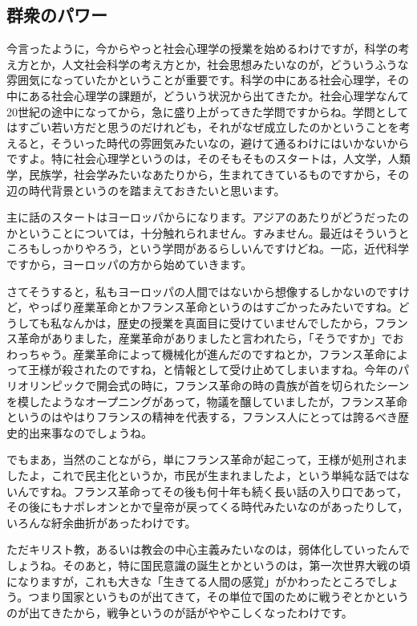 \documentclass{ltjsbook}
\begin{document}
\subsection{群衆のパワー}

今言ったように，今からやっと社会心理学の授業を始めるわけですが，科学の考え方とか，人文社会科学の考え方とか，社会思想みたいなのが，どういうふうな雰囲気になっていたかということが重要です。科学の中にある社会心理学，その中にある社会心理学の課題が，どういう状況から出てきたか。社会心理学なんて20世紀の途中になってから，急に盛り上がってきた学問ですからね。学問としてはすごい若い方だと思うのだけれども，それがなぜ成立したのかということを考えると，そういった時代の雰囲気みたいなの，避けて通るわけにはいかないからですよ。特に社会心理学というのは，そのそもそものスタートは，人文学，人類学，民族学，社会学みたいなあたりから，生まれてきているものですから，その辺の時代背景というのを踏まえておきたいと思います。

主に話のスタートはヨーロッパからになります。アジアのあたりがどうだったのかということについては，十分触れられません。すみません。最近はそういうところもしっかりやろう，という学問があるらしいんですけどね。一応，近代科学ですから，ヨーロッパの方から始めていきます。

さてそうすると，私もヨーロッパの人間ではないから想像するしかないのですけど，やっぱり産業革命とかフランス革命というのはすごかったみたいですね。どうしても私なんかは，歴史の授業を真面目に受けていませんでしたから，フランス革命がありました，産業革命がありましたと言われたら，「そうですか」でおわっちゃう。産業革命によって機械化が進んだのですねとか，フランス革命によって王様が殺されたのですね，と情報として受け止めてしまいますね。今年のパリオリンピックで開会式の時に，フランス革命の時の貴族が首を切られたシーンを模したようなオープニングがあって，物議を醸していましたが，フランス革命というのはやはりフランスの精神を代表する，フランス人にとっては誇るべき歴史的出来事なのでしょうね。

でもまあ，当然のことながら，単にフランス革命が起こって，王様が処刑されましたよ，これで民主化というか，市民が生まれましたよ，という単純な話ではないんですね。フランス革命ってその後も何十年も続く長い話の入り口であって，その後にもナポレオンとかで皇帝が戻ってくる時代みたいなのがあったりして，いろんな紆余曲折があったわけです。

ただキリスト教，あるいは教会の中心主義みたいなのは，弱体化していったんでしょうね。そのあと，特に国民意識の誕生とかというのは，第一次世界大戦の頃になりますが，これも大きな「生きてる人間の感覚」がかわったところでしょう。つまり国家というものが出てきて，その単位で国のために戦うぞとかというのが出てきたから，戦争というのが話がややこしくなったわけです。
\end{document}
